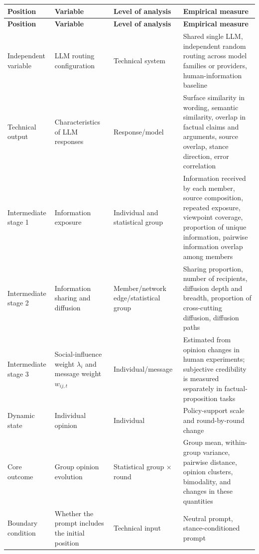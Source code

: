 \documentclass[11pt,a4paper]{article}
\renewcommand{\arraystretch}{1.2}
\begin{document}
\begin{center}
\small
\renewcommand{\arraystretch}{1.18}
\begin{longtable}{@{}p{}p{}p{}p{}@{}}
\toprule
\textbf{Position} & \textbf{Variable} & \textbf{Level of analysis} & \textbf{Empirical measure} \\
\midrule
\endfirsthead
\toprule
\textbf{Position} & \textbf{Variable} & \textbf{Level of analysis} & \textbf{Empirical measure} \\
\midrule
\endhead
Independent variable & LLM routing configuration & Technical system & Shared single LLM, independent random routing across model families or providers, human-information baseline \\
Technical output & Characteristics of LLM responses & Response/model & Surface similarity in wording, semantic similarity, overlap in factual claims and arguments, source overlap, stance direction, error correlation \\
Intermediate stage 1 & Information exposure & Individual and statistical group & Information received by each member, source composition, repeated exposure, viewpoint coverage, proportion of unique information, pairwise information overlap among members \\
Intermediate stage 2 & Information sharing and diffusion & Member/network edge/statistical group & Sharing proportion, number of recipients, diffusion depth and breadth, proportion of cross-cutting diffusion, diffusion paths \\
Intermediate stage 3 & Social-influence weight $\lambda_i$ and message weight $w_{ij,t}$ & Individual/message & Estimated from opinion changes in human experiments; subjective credibility is measured separately in factual-proposition tasks \\
Dynamic state & Individual opinion & Individual & Policy-support scale and round-by-round change \\
Core outcome & Group opinion evolution & Statistical group $\times$ round & Group mean, within-group variance, pairwise distance, opinion clusters, bimodality, and changes in these quantities \\
Boundary condition & Whether the prompt includes the initial position & Technical input & Neutral prompt, stance-conditioned prompt \\
\bottomrule
\end{longtable}
\end{center}
\end{document}
